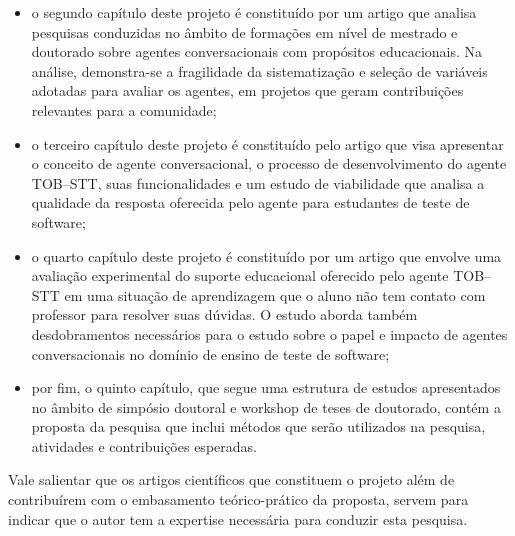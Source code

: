  \begin{itemize}

    \item o segundo capítulo deste projeto é constituído por um artigo que analisa pesquisas conduzidas no âmbito de formações em nível de mestrado e doutorado sobre agentes conversacionais com propósitos educacionais. Na análise, demonstra-se a fragilidade da sistematização e seleção de variáveis adotadas para avaliar os agentes, em projetos que geram contribuições relevantes para a comunidade;

    \item o terceiro capítulo deste projeto é constituído pelo artigo que visa apresentar o conceito de agente conversacional, o processo de desenvolvimento do agente TOB--STT, suas funcionalidades e um estudo de viabilidade que analisa a qualidade da resposta oferecida pelo agente para estudantes de teste de software;
 
    \item o quarto capítulo deste projeto é constituído por um artigo que envolve uma avaliação experimental do suporte educacional oferecido pelo agente TOB--STT em uma situação de aprendizagem que o aluno não tem contato com professor para resolver suas dúvidas. O estudo aborda também desdobramentos necessários para o estudo sobre o papel e impacto de agentes conversacionais no domínio de ensino de teste de software;

    \item por fim, o quinto capítulo, que segue uma estrutura de estudos apresentados no âmbito de simpósio doutoral e workshop de teses de doutorado, contém a proposta da pesquisa que inclui métodos que serão utilizados na pesquisa, atividades e contribuições esperadas.
    
 \end{itemize}
 
Vale salientar que os artigos científicos que constituem o projeto além de contribuírem com o embasamento teórico-prático da proposta, servem  para indicar que o autor tem a expertise necessária para conduzir esta pesquisa.



